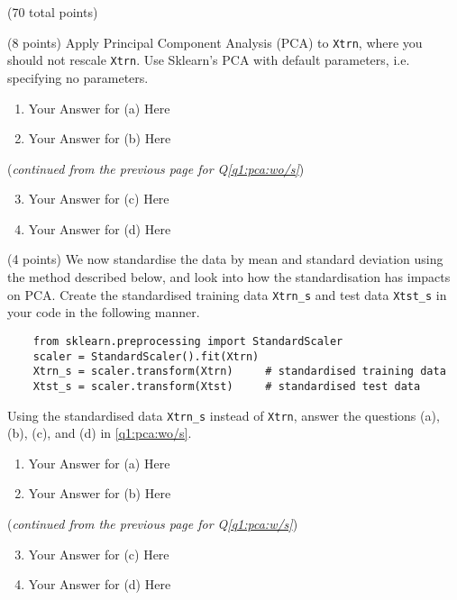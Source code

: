 \documentclass[12pt]{article}
\begin{document}
\begin{question}{(70 total points) \qOneTitle}
\begin{subquestion}{(8 points)
    Apply Principal Component Analysis (PCA) to {\tt Xtrn}, where you should not rescale {\tt Xtrn}.
    Use Sklearn's PCA with default parameters, i.e. specifying no parameters.
  }
  \begin{answerbox}{0.5\textheight}
    \begin{enumerate}
    \item Your Answer for (a) Here
    \item Your Answer for (b) Here
    \end{enumerate}
  \end{answerbox}
  \clearpage
  ({\it continued from the previous page for Q\ref{q1:pca:wo/s}})
  \begin{answerbox}{0.6\textheight}
    \begin{enumerate}\setcounter{enumi}{2}
    \item Your Answer for (c) Here
    \item Your Answer for (d) Here
    \end{enumerate}
  \end{answerbox}
    


\end{subquestion}

\begin{subquestion}{(4 points) %
    We now standardise the data by mean and standard deviation using the method described below, and look into how the standardisation has impacts on PCA.
  }\label{q1:pca:w/s}
  Create the standardised training data {\tt Xtrn\_s} and test data {\tt Xtst\_s} in your code in the following manner.
  \begin{lstlisting}
    from sklearn.preprocessing import StandardScaler
    scaler = StandardScaler().fit(Xtrn)
    Xtrn_s = scaler.transform(Xtrn)     # standardised training data
    Xtst_s = scaler.transform(Xtst)     # standardised test data
   \end{lstlisting}
   Using the standardised data {\tt Xtrn\_s} instead of {\tt Xtrn}, 
   answer the questions (a), (b), (c), and (d) in \ref{q1:pca:wo/s}.


  \begin{answerbox}{0.5\textheight}
    \begin{enumerate}
    \item Your Answer for (a) Here
    \item Your Answer for (b) Here
    \end{enumerate}
  \end{answerbox}
  \clearpage
  ({\it continued from the previous page for Q\ref{q1:pca:w/s}})
  \begin{answerbox}{0.6\textheight}
    \begin{enumerate}\setcounter{enumi}{2}
    \item Your Answer for (c) Here
    \item Your Answer for (d) Here
    \end{enumerate}
  \end{answerbox}
  



\end{subquestion}
\end{question}
\end{document}
